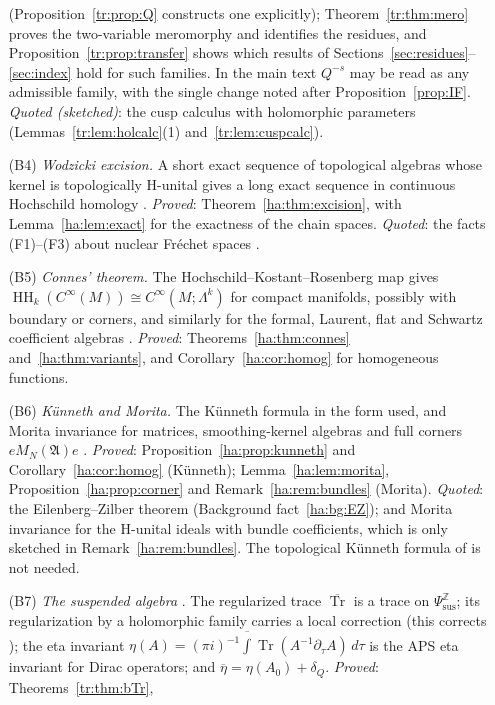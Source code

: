 \documentclass[11pt,oneside,reqno]{article}
\DeclareMathOperator{\HH}{HH}
\DeclareMathOperator{\Tr}{Tr}
\newcommand{\Z}{\mathbb Z}
\newcommand{\Psis}{\Psi_{\mathrm{sus}}}
\newcommand{\bTr}{\overline{\Tr}}
\newcommand{\CI}{C^\infty}
\newcommand{\etab}{\overline\eta}
\theoremstyle{plain}
\theoremstyle{definition}
\theoremstyle{remark}
\begin{document}
\begin{enumerate}
(Proposition~\ref{tr:prop:Q} constructs one explicitly);
Theorem~\ref{tr:thm:mero} proves the two-variable meromorphy and identifies
the residues, and Proposition~\ref{tr:prop:transfer} shows which results
of Sections~\ref{sec:residues}--\ref{sec:index} hold for such families. In
the main text \(Q^{-s}\) may be read as any admissible family, with the
single change noted after Proposition~\ref{prop:IF}. \emph{Quoted
(sketched)}: the cusp calculus with holomorphic parameters
(Lemmas~\ref{tr:lem:holcalc}(1) and~\ref{tr:lem:cuspcalc}).
\item[(B4)] \emph{Wodzicki excision.} A short exact sequence of
topological algebras whose kernel is topologically H-unital gives a long
exact sequence in continuous Hochschild homology \cite{Wodzicki}.
\emph{Proved}: Theorem~\ref{ha:thm:excision}, with
Lemma~\ref{ha:lem:exact} for the exactness of the chain spaces.
\emph{Quoted}: the facts (F1)--(F3) about nuclear Fr\'echet spaces
\cite{Treves}.
\item[(B5)] \emph{Connes' theorem.} The Hochschild--Kostant--Rosenberg map
gives \(\HH_k(\CI(M))\cong\CI(M;\Lambda^k)\) for compact manifolds,
possibly with boundary or corners, and similarly for the formal, Laurent,
flat and Schwartz coefficient algebras \cite{Connes}. \emph{Proved}:
Theorems~\ref{ha:thm:connes} and~\ref{ha:thm:variants}, and
Corollary~\ref{ha:cor:homog} for homogeneous functions.
\item[(B6)] \emph{K\"unneth and Morita.} The K\"unneth formula in the
form used, and Morita invariance for matrices, smoothing-kernel algebras
and full corners \(eM_N(\mathfrak A)e\) \cite{Connes,Loday}. \emph{Proved}:
Proposition~\ref{ha:prop:kunneth} and Corollary~\ref{ha:cor:homog}
(K\"unneth); Lemma~\ref{ha:lem:morita}, Proposition~\ref{ha:prop:corner}
and Remark~\ref{ha:rem:bundles} (Morita). \emph{Quoted}: the
Eilenberg--Zilber theorem (Background fact~\ref{ha:bg:EZ}); and Morita
invariance for the H-unital ideals with bundle coefficients, which is only
sketched in Remark~\ref{ha:rem:bundles}. The topological K\"unneth formula
of \cite{Karoubi} is not needed.
\item[(B7)] \emph{The suspended algebra} \cite{MelroseEta}. The
regularized trace \(\bTr\) is a trace on \(\Psis^{\Z}\); its regularization
by a holomorphic family carries a local correction (this corrects
\cite[Prop.~8]{MN}); the eta invariant
\(\eta(A)=(\pi i)^{-1}\overline{\int}\Tr(A^{-1}\partial_\tau A)\,d\tau\)
is the APS eta invariant for Dirac operators; and \(\etab=\eta(A_0)+
\delta_Q\). \emph{Proved}: Theorems~\ref{tr:thm:bTr},

\end{enumerate}
\end{document}
